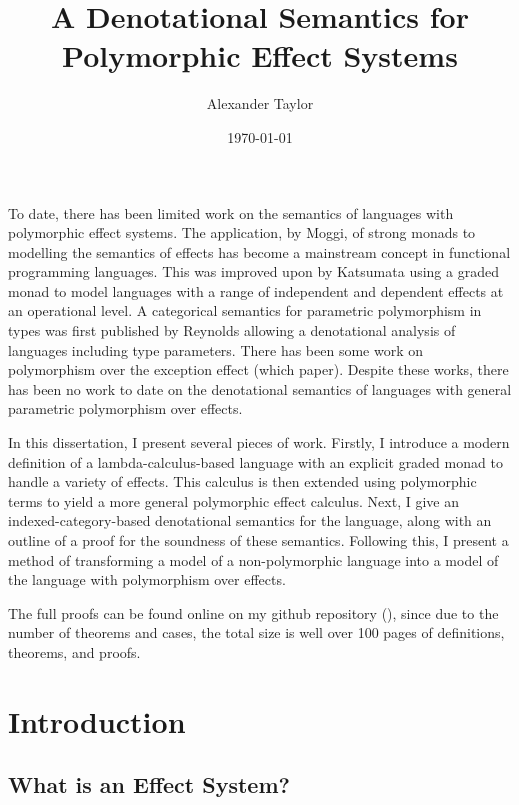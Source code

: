 \documentclass{Report}
\title{A Denotational Semantics for Polymorphic Effect Systems}
\date{\today}
\author{Alexander Taylor}
\begin{document}
\maketitle



\abstract
To date, there has been limited work on the semantics of languages with polymorphic effect systems. The application, by Moggi, of strong monads to modelling the semantics of effects has become a mainstream concept in functional programming languages. This was improved upon by Katsumata \needsRef{} using a graded monad to model languages with a range of independent and dependent effects at an operational level. A categorical semantics for parametric polymorphism in types was first published by Reynolds \needsRef{} allowing a denotational analysis of languages including type parameters. There has been some work on polymorphism over the exception effect (which paper). Despite these works, there has been no work to date on the denotational semantics of languages with general parametric polymorphism over effects.

In this dissertation, I present several pieces of work. Firstly, I introduce a modern definition of a lambda-calculus-based language with an explicit graded monad to handle a variety of effects. This calculus is then extended using polymorphic terms to yield a more general polymorphic effect calculus. Next, I give an indexed-category-based denotational semantics for the language, along with an outline of a proof for the soundness of these semantics. Following this, I present a method of transforming a model of a non-polymorphic language into a model of the language with polymorphism over effects.

The full proofs can be found online on my github repository (), since due to the number of theorems and cases, the total size is well over 100 pages of definitions, theorems, and proofs.

\tableofcontents

\chapter{Introduction}


\section{What is an Effect System?}
\end{document}
